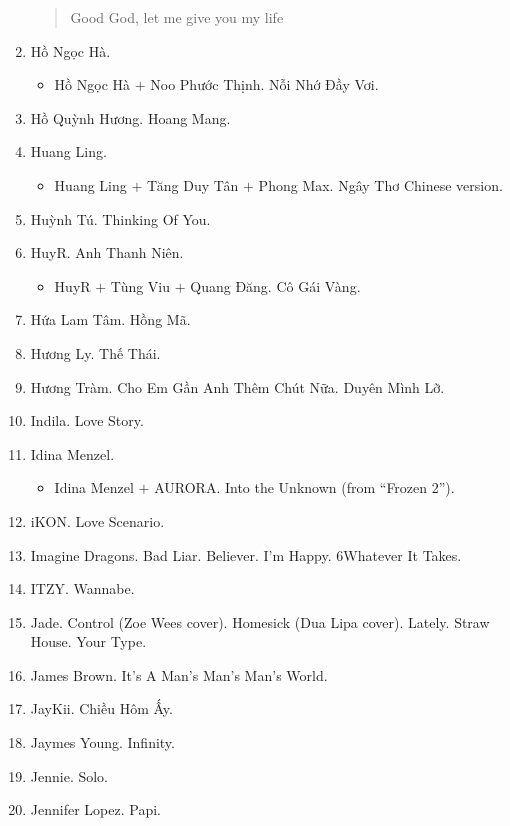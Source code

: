 \documentclass{article}
\begin{document}
\begin{enumerate}
\begin{quotation}
		Good God, let me give you my life
	\end{quotation}
	\item {\sc Hồ Ngọc Hà.}
	\begin{itemize}
		\item {\sc Hồ Ngọc Hà $+$ Noo Phước Thịnh.} Nỗi Nhớ Đầy Vơi.
	\end{itemize}
	\item {\sc Hồ Quỳnh Hương.} Hoang Mang.
	\item {\sc Huang Ling.}
	\begin{itemize}
		\item {\sc Huang Ling $+$ Tăng Duy Tân $+$ Phong Max.} Ngây Thơ Chinese version.
	\end{itemize}
	\item {\sc Huỳnh Tú.} Thinking Of You.
	\item {\sc HuyR.} Anh Thanh Niên.
	\begin{itemize}
		\item {\sc HuyR $+$ Tùng Viu $+$ Quang Đăng.} Cô Gái Vàng.
	\end{itemize}
	\item {\sc Hứa Lam Tâm.} Hồng Mã.
	\item {\sc Hương Ly.} Thế Thái.
	\item {\sc Hương Tràm.} Cho Em Gần Anh Thêm Chút Nữa. Duyên Mình Lỡ.
	\item {\sc Indila.} Love Story.
	\item {\sc Idina Menzel.}
	\begin{itemize}
		\item {\sc Idina Menzel $+$ AURORA.} Into the Unknown (from ``Frozen 2'').
	\end{itemize}
	\item {\sc iKON.} Love Scenario. 
	\item {\sc Imagine Dragons.} Bad Liar. Believer. I'm Happy. 6Whatever It Takes.
	\item {\sc ITZY.} Wannabe.
	\item {\sc Jade.} Control (Zoe Wees cover). Homesick (Dua Lipa cover). Lately. Straw House. Your Type.
	\item {\sc James Brown.} It's A Man's Man's Man's World.
	\item {\sc JayKii.} Chiều Hôm Ấy.
	\item {\sc Jaymes Young.} Infinity.
	\item {\sc Jennie.} Solo.
	\item {\sc Jennifer Lopez.} Papi.
	\begin{itemize}

\end{itemize}
\end{enumerate}
\end{document}
